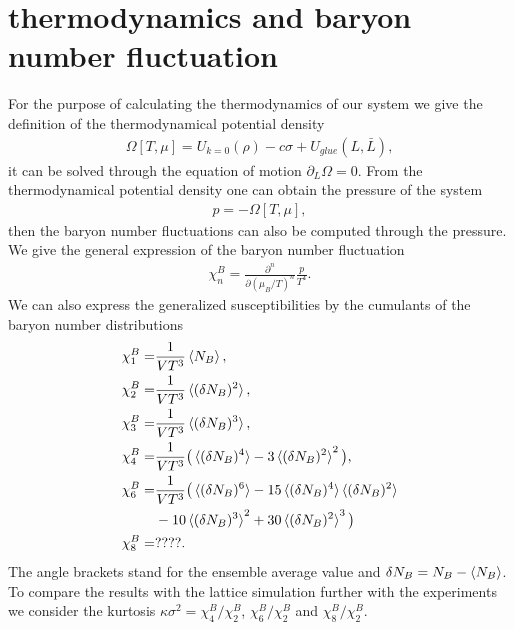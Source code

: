 \documentclass[%
reprint,
superscriptaddress,
showpacs,preprintnumbers,
 amsmath,amssymb,
 aps,
prd,
]{revtex4-1}
\begin{document}
\section{thermodynamics and baryon number fluctuation}
\label{sec:BNF}
For the purpose of calculating the thermodynamics of our system we give the definition of the thermodynamical potential density 
\begin{align}
\Omega[T,\mu]=U_{k=0}(\rho)-c\sigma+U_{glue}(L,\bar{L}),
\end{align} 
it can be solved through the equation of motion $\partial_L\Omega=0$.
From the thermodynamical potential density one can obtain the pressure of the system
\begin{align}
p=-\Omega[T,\mu],
\end{align}
then the baryon number fluctuations can also be computed through the pressure. We give the general expression of the baryon number fluctuation
\begin{align}
\chi^B_n=\frac{\partial^n}{\partial(\mu_B/T)^n}\frac{p}{T^4}.
\end{align}
We can also express the generalized susceptibilities by the cumulants of the baryon number distributions
\begin{align}
\chi^B_1=&\frac{1}{VT^3}\braket{N_B},\\
\chi^B_2=&\frac{1}{VT^3}\braket{(\delta N_B)^2},\\
\chi^B_3=&\frac{1}{VT^3}\braket{(\delta N_B)^3},\\
\chi^B_4=&\frac{1}{VT^3}\big(\braket{(\delta N_B)^4}-3\braket{(\delta N_B)^2}^2\big),\\
\chi^B_6=&\frac{1}{VT^3}\big(\braket{(\delta N_B)^6}-15\braket{(\delta N_B)^4}\braket{(\delta N_B)^2}\nonumber\\
&-10\braket{(\delta N_B)^3}^2+30\braket{(\delta N_B)^2}^3\big)\\
\chi^B_8=&????.
\end{align}
The angle brackets stand for the ensemble average value and $\delta N_B=N_B-\braket{N_B}$. To compare the results with the lattice simulation further with the experiments we consider the kurtosis $\kappa\sigma^2=\chi^B_4/\chi^B_2$, $\chi^B_6/\chi^B_2$ and $\chi^B_8/\chi^B_2$.


\end{document}
